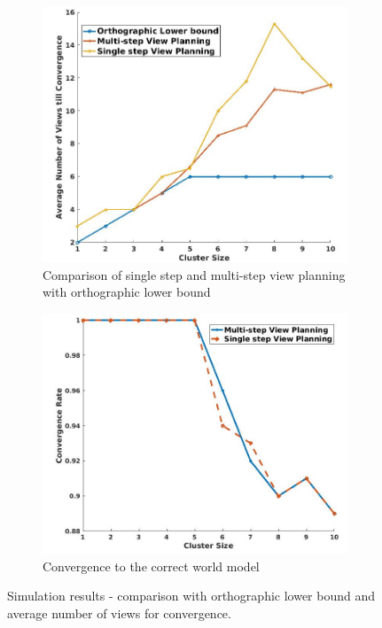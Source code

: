 \begin{figure}[!htbp]
\centering
\begin{subfigure}[t]{.48\textwidth}
    \includegraphics[width=\textwidth]{figures/active_counting/simview.jpg}
\caption{Comparison of single step and multi-step view planning with orthographic lower bound}
\label{fig:simview}
\end{subfigure}
\begin{subfigure}[t]{.48\textwidth}
    \includegraphics[width=\textwidth]{figures/active_counting/simcon.jpg}
\caption{Convergence to the correct world model}
\label{fig:simcon}
\end{subfigure}
\caption[Simulation results - comparison with orthographic lower bound and average number of views for convergence.]{Simulation results - comparison with orthographic lower bound and average number of views for convergence.}
\label{fig:sim}
\end{figure}


